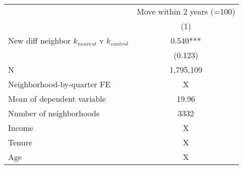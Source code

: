 \begin{tabular}{lc}
\toprule
 & Move within 2 years (=100) \\ 
\cmidrule(lr){2-2}
  & (1) \\ 
\midrule
New diff neighbor $k_{nearest}$ v $k_{control}$ & 0.540*** \\ 
 & (0.123) \\ 
 \midrule
N & 1,795,109 \\ 
Neighborhood-by-quarter FE & X \\ 
Mean of dependent variable & 19.96 \\ 
Number of neighborhoods & 3332 \\ 
Income & X \\ 
Tenure & X \\ 
Age & X \\ 
\bottomrule
\end{tabular}